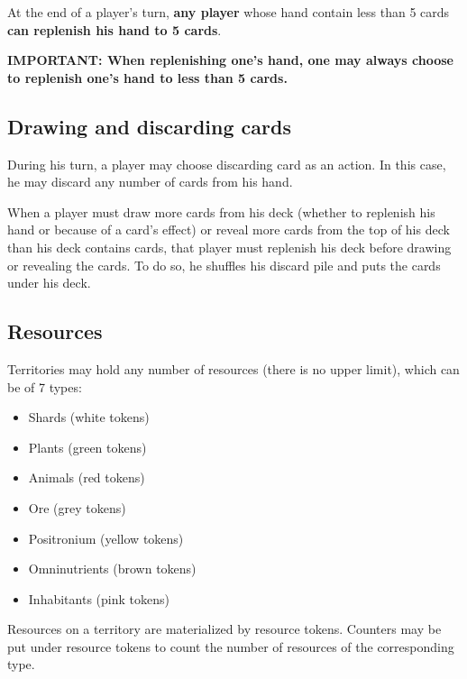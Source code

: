 \documentclass[a4paper]{article}
\begin{document}
    \vspace{-0.7em}
    At the end of a player's turn, \textbf{any player} whose hand contain less than 5
    cards \textbf{can replenish his hand to 5 cards}.
    
    \hspace{-2em} \textbf{IMPORTANT:
    When replenishing one's hand, one may always choose to replenish one's hand to
    less than 5 cards.
    }


\newpage
  \subsection{Drawing and discarding cards}
    
    During his turn, a player may choose discarding card as an action.
    In this case, he may discard any number of cards from his hand.

    When a player must draw more cards from his deck
    (whether to replenish his hand or because of a card's effect)
    or reveal more cards from the top of his deck than his deck contains cards,
    that player must replenish his deck before drawing or revealing the cards.
    To do so, he shuffles his discard pile and puts the cards under his deck.


  \subsection{Resources}
  
    Territories may hold any number of resources (there is no upper limit),
    which can be of 7 types:
    
    \vspace{-1.3em}
    \begin{itemize}
        \item Shards (white tokens)
        \item Plants (green tokens)
        \item Animals (red tokens)
        \item Ore (grey tokens)
        \item Positronium (yellow tokens)
        \item Omninutrients (brown tokens)
        \item Inhabitants (pink tokens)
    \end{itemize}
    
    \vspace{-0.7em}
    Resources on a territory are materialized by resource tokens.
    Counters may be put under resource tokens to count the number of
    resources of the corresponding type.
    
\end{document}
